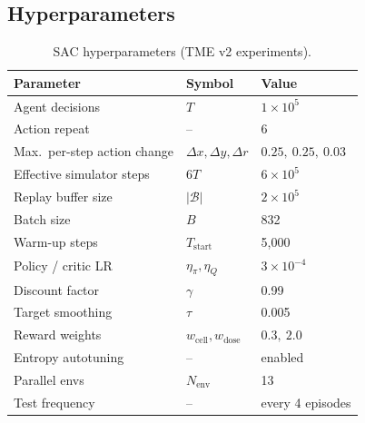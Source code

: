\documentclass{article}
\begin{document}
\subsection{Hyperparameters}
\label{app:hyperparams}

\begin{table}[h]
  \centering\small
  \caption{SAC hyperparameters (TME v2 experiments).}
  \label{tab:hyperparams}
  \begin{tabular}{lll}
    \toprule
    \textbf{Parameter} & \textbf{Symbol} & \textbf{Value} \\
    \midrule
    Agent decisions      & $T$              & $1\!\times\!10^5$ \\
    Action repeat        & --               & 6 \\
    Max.\ per-step action change & $\Delta x,\Delta y,\Delta r$ & $0.25,\ 0.25,\ 0.03$ \\
    Effective simulator steps & $6T$        & $6\!\times\!10^5$ \\
    Replay buffer size   & $|\mathcal{B}|$  & $2\!\times\!10^5$ \\
    Batch size           & $B$              & 832 \\
    Warm-up steps        & $T_\text{start}$ & 5{,}000 \\
    Policy / critic LR   & $\eta_\pi,\eta_Q$& $3\!\times\!10^{-4}$ \\
    Discount factor      & $\gamma$         & 0.99 \\
    Target smoothing     & $\tau$           & 0.005 \\
    Reward weights       & $w_\text{cell},w_\text{dose}$ & $0.3,\ 2.0$ \\
    Entropy autotuning   & --               & enabled \\
    Parallel envs        & $N_\text{env}$   & 13 \\
    Test frequency       & --               & every 4 episodes \\
    \bottomrule
  \end{tabular}
\end{table}
\end{document}
